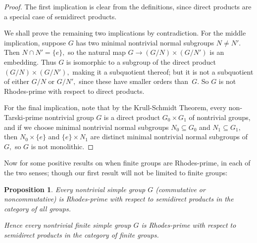 \documentclass{amsart}
\newtheorem{proposition}[theorem]{Proposition}
\numberwithin{equation}{section}
\numberwithin{theorem}{section}
\begin{document}
\begin{proof}
The first implication is clear from the definitions, since
direct products are a special case of semidirect products.

We shall prove the remaining two implications by contradiction.
For the middle implication, suppose $G$ has two minimal
nontrivial normal subgroups $N\neq N'.$
Then $N\cap N'=\{e\},$
so the natural map $G\to (G/N)\times(G/N')$ is an embedding.
Thus $G$ is isomorphic to a subgroup of the
direct product $(G/N)\times(G/N'),$ making it a subquotient thereof;
but it is not a subquotient of
either $G/N$ or $G/N',$ since these have smaller orders than~$G.$
So $G$ is not Rhodes-prime with respect to direct products.

For the final implication, note that by the Krull-Schmidt
Theorem, every non-Tarski-prime nontrivial group $G$ is a direct
product $G_0\times G_1$ of nontrivial groups, and if we choose minimal
nontrivial normal subgroups $N_0\subseteq G_0$ and $N_1\subseteq G_1,$
then $N_0\times\{e\}$ and $\{e\}\times N_1$ are distinct
minimal nontrivial normal subgroups of $G,$ so $G$ is not monolithic.
\end{proof}

Now for some positive results on when
finite groups are Rhodes-prime, in each of the two senses; though
our first result will not be limited to finite groups:

\begin{proposition}\label{P.x|-prime}
Every nontrivial {\em simple} group $G$ {\rm(}commutative
or noncommutative{\rm)} is Rhodes-prime with
respect to semidirect products in the category of all groups.

Hence every nontrivial {\em finite} simple group $G$ is Rhodes-prime
with respect to semidirect products in the category of finite groups.
\end{proposition}
\end{document}
